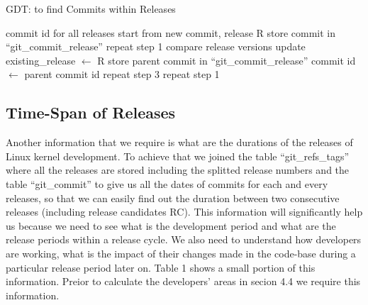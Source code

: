 \documentclass{acm_proc_article-sp}
\begin{document}
\begin{algorithm}
\caption{GDT: to find Commits within Releases}
\begin{algorithmic}[1]
\REQUIRE
\STATE commit id for all releases
\ENSURE
{}
\STATE start from new commit, release R
\STATE store commit in ``git\_commit\_release''
			\STATE repeat step 1
			\STATE compare release versions
				\STATE update existing\_release $\gets$ R
			\ENDIF
		\ELSE
			\STATE store parent commit in ``git\_commit\_release''
			\STATE commit id $\gets$ parent commit id
			\STATE repeat step 3
		\ENDIF
	\ENDFOR
{}
	\STATE repeat step 1
\ENDIF
\ENDFOR
\end{algorithmic}
\end{algorithm}

\subsection{Time-Span of Releases}
Another information that we require is what are the durations of the releases of Linux kernel development. To achieve that we joined the table ``git\_refs\_tags'' where all the releases are stored including the splitted release numbers and the table ``git\_commit'' to give us all the dates of commits for each and every releases, so that we can easily find out the duration between two consecutive releases (including release candidates RC). This information will significantly help us because we need to see what is the development period and what are the release periods within a release cycle. We also need to understand how developers are working, what is the impact of their changes made in the code-base during a particular release period later on. Table 1 shows a small portion of this information. Preior to calculate the developers' areas in secion 4.4 we require this information.
\end{document}
